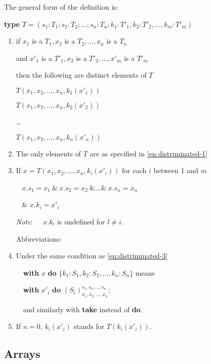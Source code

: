 The general form of the definition is:

\quad \textbf{type} $T = (s_1: T_1; s_2: T_2; \dots ; s_n:T_n; k_1: T'_1, k_2:T'_2, \dots , k_m: T'_m)$

\begin{enumerate}[wide, nosep, label=(\arabic*)]
	\item \label{en:distriminated-1}
	if $x_1$ is a $T_1, x_2$ is a $T_2, \dots, x_n$ is a $T_n$
	
	and $x'_1$ is a $T'_1, x_2$ is a $T'_2, \dots, x'_m$ is a $T'_m$
	
	then the following are distinct elements of $T$
	
	$T(x_1, x_2, \dots, x_n, k_1(x'_1))$
	
	$T(x_1, x_2, \dots, x_n, k_2(x'_2))$
	
	\quad \dots
	
	$T(x_1, x_2, \dots, x_n, k_n(x'_n))$

	\item The only elements of $T$ are as specified in \ref{en:distriminated-1}
	
	\item\label{en:distriminated-3}
	If $x = T(x_1, x_2, \dots, x_n, k_i(x'_i))$ for each $i$ between 1 and $m$
	
	\qquad~ $x.s_1 = x_1\ \&\ x.s_2 = x_2\ \& \dots \&\ x.s_n = x_n$
	
	\quad~ \& $x.k_i = x'_i$

	\noindent
	\textit{Note}:\quad~~\, $x.k_l$ is undefined for $l \neq i.$
	
	\noindent
	Abbreviations:
	
	\item Under the same condition as \ref{en:distriminated-3} 
	
	\quad~\, \textbf{with} $x$ \textbf{do} $\{k_1:S_1, k_2:S_2, \dots, k_n:S_n\}$ means

	\quad~\, \textbf{with} $x'_i$ \textbf{do} $(S_i)_{x_1, x_2, \dots, x_n}^{s_1, s_2, \dots, s_n}$;

	\quad~\, and similarly with \textbf{take} instead of \textbf{do}.

	\item If $n = 0$, $k_i(x'_i)$ stands for $T(k_i(x'_i)).$
\end{enumerate}

\subsection{Arrays}

